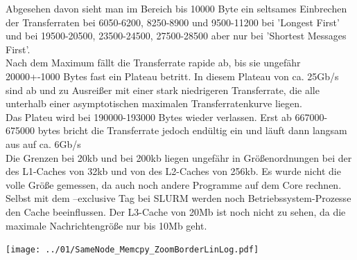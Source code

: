 \documentclass[12pt,a4paper]{article}
\begin{document}
Abgesehen davon sieht man im Bereich bis 10000 Byte ein seltsames Einbrechen der Transferraten bei  6050-6200, 8250-8900 und 9500-11200 bei 'Longest First' und bei 19500-20500, 23500-24500, 27500-28500 aber nur bei 'Shortest Messages First'.\\

Nach dem Maximum fällt die Transferrate rapide ab, bis sie ungefähr 20000+-1000 Bytes fast ein Plateau betritt. In diesem Plateau von ca. 25Gb/s sind ab und zu Ausreißer mit einer stark niedrigeren Transferrate, die alle unterhalb einer asymptotischen maximalen Transferratenkurve liegen.\\

Das Plateu wird bei 190000-193000 Bytes wieder verlassen. Erst ab 667000-675000 bytes bricht die Transferrate jedoch endültig ein und läuft dann langsam aus auf ca. 6Gb/s\\


Die Grenzen bei 20kb und bei 200kb liegen ungefähr in Größenordnungen bei der des L1-Caches von 32kb und von des L2-Caches von 256kb. Es wurde nicht die volle Größe gemessen, da auch noch andere Programme auf dem Core rechnen. Selbst mit dem --exclusive Tag bei SLURM werden noch Betriebssystem-Prozesse den Cache beeinflussen. Der L3-Cache von 20Mb ist noch nicht zu sehen, da die maximale Nachrichtengröße nur bis 10Mb geht.\\

\begin{center}
	\centering
	\captionsetup{type=figure}
	\begin{minipage}{0.6\linewidth}
		\texttt{[image: ../01/SameNode\_Memcpy\_ZoomBorderLinLog.pdf]}
	\end{minipage}
	\label{fig:SameNode_Memcpy_ZoomBorderLinLog}
\end{center}
\end{document}
